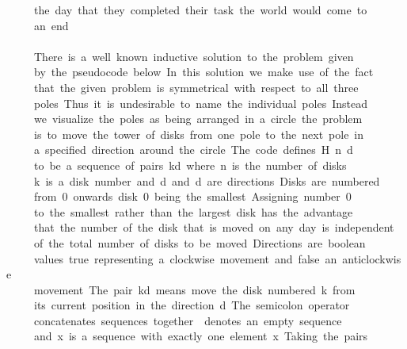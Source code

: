 \documentclass[a4paper]{article}
\begin{document}
\begin{tabbing}
\ttfamily ~~~~~the~day~that~they~completed~their~task~the~world~would~come~to\\
\ttfamily ~~~~~an~end\\
\ttfamily ~~~~~\\
\ttfamily ~~~~~There~is~a~well~known~inductive~solution~to~the~problem~given\\
\ttfamily ~~~~~by~the~pseudocode~below~In~this~solution~we~make~use~of~the~fact\\
\ttfamily ~~~~~that~the~given~problem~is~symmetrical~with~respect~to~all~three\\
\ttfamily ~~~~~poles~Thus~it~is~undesirable~to~name~the~individual~poles~Instead\\
\ttfamily ~~~~~we~visualize~the~poles~as~being~arranged~in~a~circle~the~problem\\
\ttfamily ~~~~~is~to~move~the~tower~of~disks~from~one~pole~to~the~next~pole~in\\
\ttfamily ~~~~~a~specified~direction~around~the~circle~The~code~defines~H~n~d\\
\ttfamily ~~~~~to~be~a~sequence~of~pairs~kd~where~n~is~the~number~of~disks\\
\ttfamily ~~~~~k~is~a~disk~number~and~d~and~d~are~directions~Disks~are~numbered\\
\ttfamily ~~~~~from~0~onwards~disk~0~being~the~smallest~Assigning~number~0\\
\ttfamily ~~~~~to~the~smallest~rather~than~the~largest~disk~has~the~advantage\\
\ttfamily ~~~~~that~the~number~of~the~disk~that~is~moved~on~any~day~is~independent\\
\ttfamily ~~~~~of~the~total~number~of~disks~to~be~moved~Directions~are~boolean\\
\ttfamily ~~~~~values~true~representing~a~clockwise~movement~and~false~an~anticlockwise\\
\ttfamily ~~~~~movement~The~pair~kd~means~move~the~disk~numbered~k~from\\
\ttfamily ~~~~~its~current~position~in~the~direction~d~The~semicolon~operator\\
\ttfamily ~~~~~concatenates~sequences~together~~denotes~an~empty~sequence\\
\ttfamily ~~~~~and~x~is~a~sequence~with~exactly~one~element~x~Taking~the~pairs\\

\end{tabbing}
\end{document}

